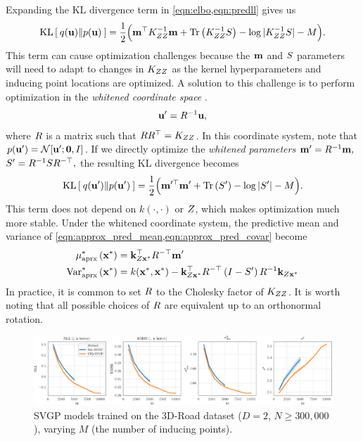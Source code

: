 Expanding the KL divergence term in \cref{eqn:elbo,eqn:predll} gives us
%
\begin{equation}
	\kl{ q(\bu) }{ p(\bu) } = \frac{1}{2} \Bigl( \bm^\top \bK_{\bZ\bZ}^{-1} \bm + \tr{ \bK_{\bZ\bZ}^{-1} \bS } - \log \vert \bK_{\bZ\bZ}^{-1} \bS \vert - M \Bigr).
	\label{eqn:kldiv}
\end{equation}
%
This term can cause optimization challenges because the $\mathbf{m}$ and $S$ parameters will need to adapt to changes in $K_{ZZ}$ as the kernel hyperparameters and inducing point locations are optimized.
A solution to this challenge is to perform optimization in the \emph{whitened coordinate space} \cite{matthews2017scalable}.
\[ \mathbf{u}' = R^{-1} \mathbf{u}, \]
where $R$ is a matrix such that $R R^\top = K_{ZZ}$.
In this coordinate system, note that $p(\bu') = \normaldist{ \bu'; \bzero}{\bI}$.
If we directly optimize the \emph{whitened parameters} $\mathbf{m}' = R^{-1} \mathbf{m},$ $S' = R^{-1} S R^{-\top},$
the resulting KL divergence becomes
%
\begin{equation}
	\kl{ q(\bu') }{ p(\bu') } = \frac{1}{2} \Bigl( \bm^{\prime \top} \bm' + \tr{ \bS' } - \log \vert \bS' \vert - M \Bigr).
	\label{eqn:kldiv_whitened}
\end{equation}
%
This term does not depend on $k(\cdot,\cdot)$ or $Z$, which makes optimization much more stable.
Under the whitened coordinate system, the predictive mean and variance of \cref{eqn:approx_pred_mean,eqn:approx_pred_covar} become
%
\begin{align}
  \mu^*_\text{aprx} \left( \mathbf{x}^* \right) &= \mathbf{k}_{Z\mathbf{x}^*}^\top R^{-\top} \mathbf{m}'
  \label{eqn:approx_pred_mean} \\
  \text{Var}^*_\text{aprx} \left( \mathbf{x}^* \right) &= k(\mathbf{x}^*, \mathbf{x}^*) -
    \mathbf{k}_{Z\mathbf{x}^*}^\top R^{-\top} \left( I - S' \right) R^{-1} \mathbf{k}_{Z\mathbf{x}^*}
  \label{eqn:approx_pred_covar}
\end{align}
%
In practice, it is common to set $R$ to the Cholesky factor of $K_{ZZ}$.
It is worth noting that all possible choices of $R$ are equivalent up to an orthonormal rotation.

\begin{figure}[t!]
  \centering
  \includegraphics[width=\linewidth]{figures/3droad.pdf}
  \caption{
    SVGP models trained on the 3D-Road dataset ($D=2$, $N\geq300,\!000$), varying $M$ (the number of inducing points).
  }
  \label{fig:3droad}
\end{figure}

